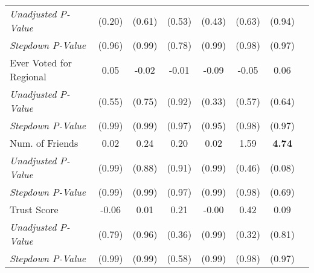 \begin{tabular}{l c c c c c c c}
\quad \textit{Unadjusted P-Value} & (0.20) & (0.61) & (0.53) & (0.43) & (0.63) & (0.94) \\
\quad \textit{Stepdown P-Value} & (0.96) & (0.99) & (0.78) & (0.99) & (0.98) & (0.97) \\
Ever Voted for Regional & 0.05 & -0.02 & -0.01 & -0.09 & -0.05 & 0.06 \\
\quad \textit{Unadjusted P-Value} & (0.55) & (0.75) & (0.92) & (0.33) & (0.57) & (0.64) \\
\quad \textit{Stepdown P-Value} & (0.99) & (0.99) & (0.97) & (0.95) & (0.98) & (0.97) \\
Num. of Friends & 0.02 & 0.24 & 0.20 & 0.02 & 1.59 & \textbf{ 4.74 } \\
\quad \textit{Unadjusted P-Value} & (0.99) & (0.88) & (0.91) & (0.99) & (0.46) & (0.08) \\
\quad \textit{Stepdown P-Value} & (0.99) & (0.99) & (0.97) & (0.99) & (0.98) & (0.69) \\
Trust Score & -0.06 & 0.01 & 0.21 & -0.00 & 0.42 & 0.09 \\
\quad \textit{Unadjusted P-Value} & (0.79) & (0.96) & (0.36) & (0.99) & (0.32) & (0.81) \\
\quad \textit{Stepdown P-Value} & (0.99) & (0.99) & (0.58) & (0.99) & (0.98) & (0.97) \\
\bottomrule
\end{tabular}
